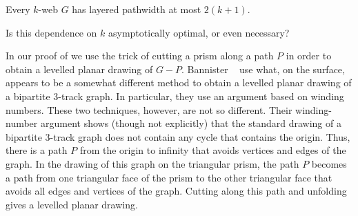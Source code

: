 \documentclass{patmorin}
\begin{document}
\begin{thm}
   Every $k$-web $G$ has layered pathwidth at most $2(k+1)$.
\end{thm}

Is this dependence on $k$ asymptotically optimal, or even necessary?

In our proof of  we use the trick of cutting a prism along
a path $P$ in order to obtain a levelled planar drawing of $G-P$.
Bannister \etal\ \cite{bannister.devanny.ea:track} use what, on the
surface, appears to be a somewhat different method to obtain a levelled
planar drawing of a bipartite 3-track graph.  In particular, they use
an argument based on winding numbers.  These two techniques, however,
are not so different. Their winding-number argument shows (though not
explicitly) that the standard drawing of a bipartite 3-track graph
does not contain any cycle that contains the origin.  Thus, there is
a path $P$ from the origin to infinity that avoids vertices and edges
of the graph.  In the drawing of this graph on the triangular prism,
the path $P$ becomes a path from one triangular face of the prism to the
other triangular face that avoids all edges and vertices of the graph.
Cutting along this path and unfolding gives a levelled planar drawing.




\end{document}
